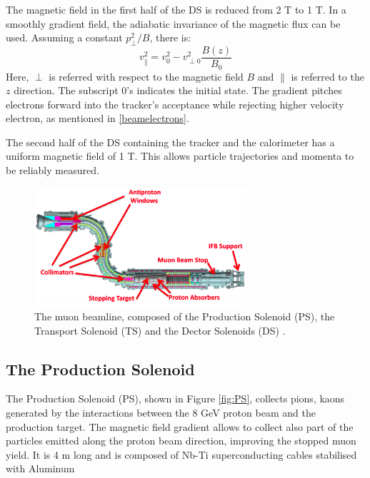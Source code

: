 The magnetic field in the first half of 
the DS is reduced from 2 T to 1 T. In a smoothly gradient field, the adiabatic 
invariance of the magnetic flux can be used. Assuming a constant $p^2_\perp/B$, there is:
\begin{equation}
    v^2_{\parallel}=v^2_0-v^2_{\perp 0}\frac{B(z)}{B_0}
\end{equation}
Here, $\perp$ is referred with respect to the magnetic field $B$ and $\parallel$ is 
referred to the $z$ direction. The subscript 0's indicates the initial state. 
The gradient pitches electrons forward into the tracker's acceptance
{\red while rejecting higher velocity electron, as mentioned in \ref{beamelectrons}.}

The second half of the DS containing the tracker and the calorimeter has a 
uniform magnetic field of 1 T.
{\red This allows particle trajectories and momenta to be reliably measured.}

\begin{figure}[!h]
\centering
\includegraphics[width =0.7\textwidth]{figures/png/Screenshot_20240303_152845.png}
\caption[The muon beamline.]{The muon beamline, composed of the Production Solenoid (PS), 
the Transport Solenoid (TS) and the Dector Solenoids (DS) \cite{ginther}. 
}
\label{fig:muonbeamline}
\end{figure}


\subsection{The Production Solenoid}
The Production Solenoid (PS), shown in Figure \ref{fig:PS}, collects pions, 
kaons generated by the interactions between the 8 GeV proton beam and the production target. 
The magnetic field gradient allows to collect also part of the particles 
emitted along the proton beam direction, improving the stopped muon yield.
It is 4 m long {\red and is composed of Nb-Ti superconducting cables stabilised with Aluminum}

